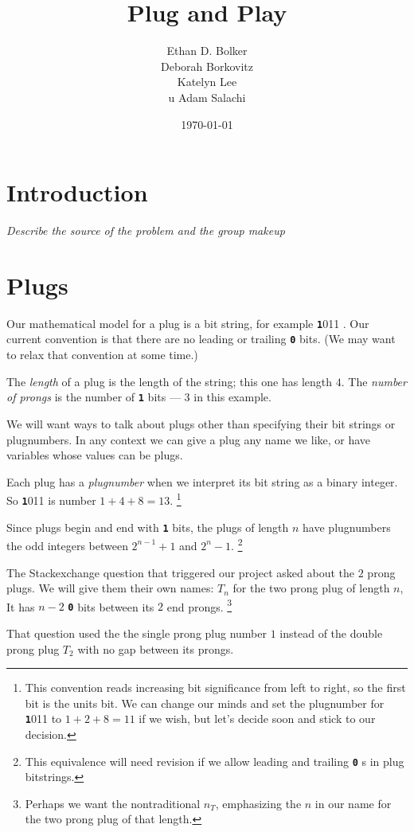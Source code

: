 \documentclass[10pt]{article}
\title{Plug and Play}
\author{
Ethan D. Bolker \\
Deborah Borkovitz\\
  Katelyn Lee\\u
  Adam Salachi
}
\date{\today}
\numberwithin{equation}{section}
\newcommand{\plug}[1]{%
\mbox{{\textbf\texttt #1}}
}
\begin{document}
\maketitle

\section{Introduction}

\emph{Describe the source of the problem and the group makeup}


\section{Plugs}

Our mathematical model for a plug is a bit string, for example
\plug{1011}. Our current convention is that there are no leading or
trailing \plug{0} bits. (We may want to relax that convention at some
time.)

The \emph{length} of a plug is the length of the string; this one has
length $4$. The \emph{number of prongs} is the number of \plug{1} bits
--- $3$ in this example.

We will want ways to talk about plugs other than specifying their bit
strings or plugnumbers. In any context we can give a plug any name we
like, or have variables whose values can be plugs.

Each plug has a \emph{plugnumber} when we
interpret its bit string as a binary integer. So \plug{1011} is
number $1 + 4 + 8 = 13$.%
\footnote{This convention reads increasing bit significance from left
  to right, so the first bit is the units bit. We can change our minds
  and set the plugnumber for \plug{1011} to $1+2+8 = 11$ if we wish,
  but let's decide soon and stick to our decision.}

Since plugs begin and end with \plug{1} bits,
the plugs of length $n$ have plugnumbers the odd integers between
$2^{n-1} +1$ and $2^n -1$.
\footnote{This equivalence will need revision if we allow leading and
  trailing \plug{0}s in plug bitstrings.}

The Stackexchange question that triggered our project asked about
the $2$ prong plugs. We will give
them their own names: $T_n$ for the two prong plug of length $n$, It
has $n-2$ \plug{0} bits between its $2$ end prongs.
\footnote{Perhaps we want the nontraditional $n_T$, emphasizing the
  $n$ in our name for the two prong plug of that length.}

That question used the the single prong plug number $1$ instead of the
double prong plug $T_2$ with no gap between its prongs.
\end{document}
